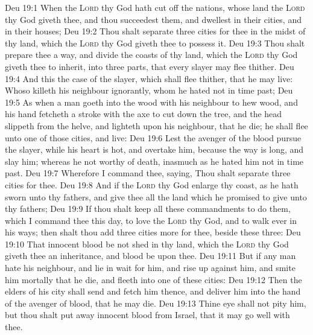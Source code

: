 \vs Deu 19:1 When the \textsc{Lord} thy God hath cut off the nations, whose land the \textsc{Lord} thy God giveth thee, and thou succeedest them, and dwellest in their cities, and in their houses;
\vs Deu 19:2 Thou shalt separate three cities for thee in the midst of thy land, which the \textsc{Lord} thy God giveth thee to possess it.
\vs Deu 19:3 Thou shalt prepare thee a way, and divide the coasts of thy land, which the \textsc{Lord} thy God giveth thee to inherit, into three parts, that every slayer may flee thither.
\vs Deu 19:4 And this  the case of the slayer, which shall flee thither, that he may live: Whoso killeth his neighbour ignorantly, whom he hated not in time past;
\vs Deu 19:5 As when a man goeth into the wood with his neighbour to hew wood, and his hand fetcheth a stroke with the axe to cut down the tree, and the head slippeth from the helve, and lighteth upon his neighbour, that he die; he shall flee unto one of those cities, and live:
\vs Deu 19:6 Lest the avenger of the blood pursue the slayer, while his heart is hot, and overtake him, because the way is long, and slay him; whereas he  not worthy of death, inasmuch as he hated him not in time past.
\vs Deu 19:7 Wherefore I command thee, saying, Thou shalt separate three cities for thee.
\vs Deu 19:8 And if the \textsc{Lord} thy God enlarge thy coast, as he hath sworn unto thy fathers, and give thee all the land which he promised to give unto thy fathers;
\vs Deu 19:9 If thou shalt keep all these commandments to do them, which I command thee this day, to love the \textsc{Lord} thy God, and to walk ever in his ways; then shalt thou add three cities more for thee, beside these three:
\vs Deu 19:10 That innocent blood be not shed in thy land, which the \textsc{Lord} thy God giveth thee  an inheritance, and  blood be upon thee.
\vs Deu 19:11 But if any man hate his neighbour, and lie in wait for him, and rise up against him, and smite him mortally that he die, and fleeth into one of these cities:
\vs Deu 19:12 Then the elders of his city shall send and fetch him thence, and deliver him into the hand of the avenger of blood, that he may die.
\vs Deu 19:13 Thine eye shall not pity him, but thou shalt put away  innocent blood from Israel, that it may go well with thee.
